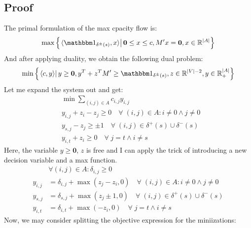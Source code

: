 \documentclass[]{article}
\theoremstyle{definition}
\begin{document}
    \subsection{Proof}
        The primal formulation of the max cpacity flow is: 
        \begin{align}
            \max\left\lbrace
            \left.
                \langle \mathbbm 1_{\delta^{\pm}(s)}, x\rangle
            \right|
            \mathbf 0 \le x \le c, M'x = \mathbf 0, x\in \mathbb R^{|A|}
            \right\rbrace
        \end{align}
        And after applying duality, we obtain the following dual problem: 
        \begin{align}
            \min\left\lbrace
                \left.\langle c, y\rangle\right|
                y\ge \mathbf 0, y^T+ z^TM'\ge \mathbbm 1_{\delta^\pm(s)}, z\in \mathbb R^{|V| - 2}, y\in \mathbb R^{|A|}_+
            \right\rbrace
        \end{align}
        Let me expand the system out and get: 
        \begin{align}
            & \min \sum_{(i, j)\in A}^{}c_{i,j} y_{i, j}
            \\
            & y_{i, j} + z_{i} - z_{j} \ge 0 \quad \forall\; (i, j)\in A: i\neq 0\wedge j\neq 0
            \\
            & y_{s, j} - z_j \ge \pm 1 \quad \forall\; (i, j) \in \delta^+(s)\cup \delta^-(s)
            \\
            & y_{i, t} + z_i\ge 0 \quad \forall\; j = t \wedge i \neq s
        \end{align}
        Here, the variable $y\ge \mathbf 0$, $z$ is free and I can apply the trick of introducing a new decision variable and a max function. 
        \begin{align}
            & \forall (i, j)\in A: \delta_{i, j} \ge 0
            \\
            y_{i, j} &= \delta_{i, j} + \max(z_j - z_i, 0) \quad \forall\; (i, j)\in A: i\neq 0\wedge j\neq 0
            \\
            y_{s, j} &= \delta_{s, j} + \max(z_j \pm 1, 0) \quad \forall\; (i, j) \in \delta^+(s)\cup \delta^-(s)
            \\
            y_{i, t} &= \delta_{i, t} + \max(-z_i, 0) \quad \forall\; j = t \wedge i \neq s
        \end{align}
        Now, we may consider splitting the objective expression for the miniizations: 
\end{document}
